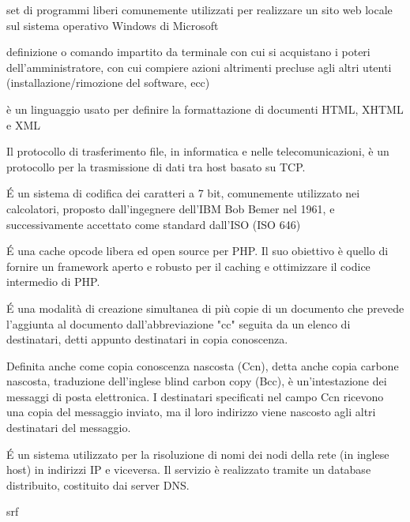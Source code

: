 \begin{acronym}
{\small set di programmi liberi comunemente utilizzati per realizzare un sito web locale sul sistema operativo Windows di Microsoft \par}
%

{\small definizione o comando impartito da terminale con cui si acquistano i poteri dell'amministratore, con cui compiere azioni altrimenti precluse agli altri utenti (installazione/rimozione del software, ecc) \par}
%

{\small è un linguaggio usato per definire la formattazione di documenti HTML, XHTML e XML \par}
%

{\small Il protocollo di trasferimento file, in informatica e nelle telecomunicazioni, è un protocollo per la trasmissione di dati tra host basato su TCP. \par}
%

{\small \'E un sistema di codifica dei caratteri a 7 bit, comunemente utilizzato nei calcolatori, proposto dall'ingegnere dell'IBM Bob Bemer nel 1961, e successivamente accettato come standard dall'ISO (ISO 646) \par}
%

{\small \'E una cache opcode libera ed open source per PHP. Il suo obiettivo è quello di fornire un framework aperto e robusto per il caching e ottimizzare il codice intermedio di PHP. \par}
%

{\small \'E una modalità di creazione simultanea di più copie di un documento che prevede l'aggiunta al documento dall'abbreviazione "cc" seguita da un elenco di destinatari, detti appunto destinatari in copia conoscenza. \par}
%
%

{\small Definita anche come copia conoscenza nascosta (Ccn), detta anche copia carbone nascosta, traduzione dell'inglese blind carbon copy (Bcc), è un'intestazione dei messaggi di posta elettronica. I destinatari specificati nel campo Ccn ricevono una copia del messaggio inviato, ma il loro indirizzo viene nascosto agli altri destinatari del messaggio. \par}
%

{\small \'E un sistema utilizzato per la risoluzione di nomi dei nodi della rete (in inglese host) in indirizzi IP e viceversa. Il servizio è realizzato tramite un database distribuito, costituito dai server DNS. \par}
%
srf


\end{acronym}
